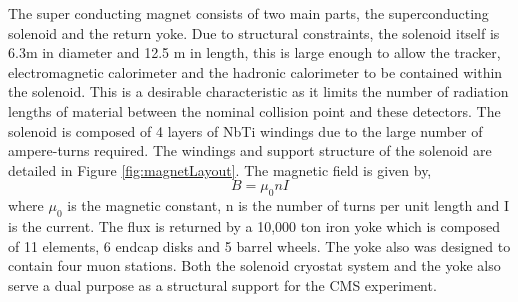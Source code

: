 The super conducting magnet consists of two main parts, the superconducting
solenoid and the return yoke.
Due to structural constraints, the solenoid itself is 6.3m in diameter and 12.5 m in length,
this is large enough to allow the tracker, electromagnetic calorimeter
and the hadronic calorimeter to be contained within the solenoid. This is
a desirable characteristic as it limits the number of radiation
lengths of material between the nominal collision point and these detectors. The solenoid
is composed of 4 layers of NbTi windings due to the large number of ampere-turns required.
 The windings and support structure of the solenoid
are detailed in Figure \ref{fig:magnetLayout}. 
The magnetic field is given by,
\begin{displaymath}
B=\mu_{0}nI
\end{displaymath}
where $\mu_{0}$ is the magnetic constant, n is the number of turns per unit length and 
I is the current. 
The flux is returned by a 10,000 ton iron yoke which is composed of 11 elements, 6 endcap disks 
and 5 barrel wheels. The yoke also was designed to contain four muon stations. 
Both the solenoid cryostat system and the yoke also serve a dual purpose as a structural support 
for the CMS experiment. 